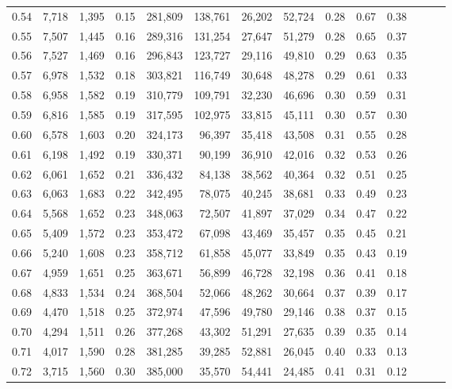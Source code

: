 \begin{tabular}{rrrrrrrrrrrrrr}
0.54 &  7,718 &  1,395 &  0.15 &  281,809 &  138,761 &  26,202 &  52,724 &  0.28 &  0.67 &      0.38 \\
0.55 &  7,507 &  1,445 &  0.16 &  289,316 &  131,254 &  27,647 &  51,279 &  0.28 &  0.65 &      0.37 \\
0.56 &  7,527 &  1,469 &  0.16 &  296,843 &  123,727 &  29,116 &  49,810 &  0.29 &  0.63 &      0.35 \\
0.57 &  6,978 &  1,532 &  0.18 &  303,821 &  116,749 &  30,648 &  48,278 &  0.29 &  0.61 &      0.33 \\
0.58 &  6,958 &  1,582 &  0.19 &  310,779 &  109,791 &  32,230 &  46,696 &  0.30 &  0.59 &      0.31 \\
0.59 &  6,816 &  1,585 &  0.19 &  317,595 &  102,975 &  33,815 &  45,111 &  0.30 &  0.57 &      0.30 \\
0.60 &  6,578 &  1,603 &  0.20 &  324,173 &   96,397 &  35,418 &  43,508 &  0.31 &  0.55 &      0.28 \\
0.61 &  6,198 &  1,492 &  0.19 &  330,371 &   90,199 &  36,910 &  42,016 &  0.32 &  0.53 &      0.26 \\
0.62 &  6,061 &  1,652 &  0.21 &  336,432 &   84,138 &  38,562 &  40,364 &  0.32 &  0.51 &      0.25 \\
0.63 &  6,063 &  1,683 &  0.22 &  342,495 &   78,075 &  40,245 &  38,681 &  0.33 &  0.49 &      0.23 \\
0.64 &  5,568 &  1,652 &  0.23 &  348,063 &   72,507 &  41,897 &  37,029 &  0.34 &  0.47 &      0.22 \\
0.65 &  5,409 &  1,572 &  0.23 &  353,472 &   67,098 &  43,469 &  35,457 &  0.35 &  0.45 &      0.21 \\
0.66 &  5,240 &  1,608 &  0.23 &  358,712 &   61,858 &  45,077 &  33,849 &  0.35 &  0.43 &      0.19 \\
0.67 &  4,959 &  1,651 &  0.25 &  363,671 &   56,899 &  46,728 &  32,198 &  0.36 &  0.41 &      0.18 \\
0.68 &  4,833 &  1,534 &  0.24 &  368,504 &   52,066 &  48,262 &  30,664 &  0.37 &  0.39 &      0.17 \\
0.69 &  4,470 &  1,518 &  0.25 &  372,974 &   47,596 &  49,780 &  29,146 &  0.38 &  0.37 &      0.15 \\
0.70 &  4,294 &  1,511 &  0.26 &  377,268 &   43,302 &  51,291 &  27,635 &  0.39 &  0.35 &      0.14 \\
0.71 &  4,017 &  1,590 &  0.28 &  381,285 &   39,285 &  52,881 &  26,045 &  0.40 &  0.33 &      0.13 \\
0.72 &  3,715 &  1,560 &  0.30 &  385,000 &   35,570 &  54,441 &  24,485 &  0.41 &  0.31 &      0.12 \\

\end{tabular}

